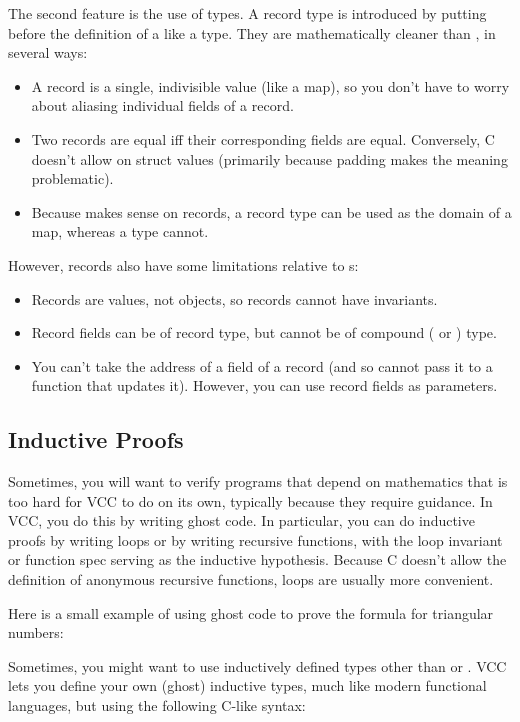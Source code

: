 The second feature is the use of  types. A record type is
introduced by putting  before the definition of a 
like a  type. They are mathematically cleaner than
, in several ways:
\begin{itemize}
\item A record is a single, indivisible value (like a map), so you
  don't have to worry about aliasing individual fields of a record.
\item Two records are equal iff their corresponding fields are
  equal. Conversely, C doesn't allow \vcc{==} on struct values
  (primarily because padding makes the meaning problematic).
\item Because \vcc{==} makes sense on records, a record type can be
  used as the domain of a map, whereas a  type cannot.
\end{itemize}
However, records also have some limitations relative to s:
\begin{itemize}
\item Records are values, not objects, so records cannot have
  invariants.
\item Record fields can be of record type, but cannot be of compound
  ( or ) type.
\item You can't take the address of a field of a record (and so cannot
  pass it to a function that updates it). However, you can use record
  fields as  parameters.
\end{itemize}

\subsection{Inductive Proofs}
Sometimes, you will want to verify programs that depend on
mathematics that is too hard for VCC to do on its own, typically
because they require guidance. In VCC, you do this by writing ghost
code. In particular, you can do inductive proofs by writing loops or
by writing recursive functions, with the loop invariant or function
spec serving as the inductive hypothesis. Because C doesn't allow the
definition of anonymous recursive functions, loops are usually more
convenient. 

Here is a small example of using ghost code to prove the formula for
triangular numbers:


Sometimes, you might want to use inductively defined types other than
\vcc{\natural} or \vcc{\integer}. VCC lets you define your own
(ghost) inductive types, much like modern functional languages, but
using the following C-like syntax:

